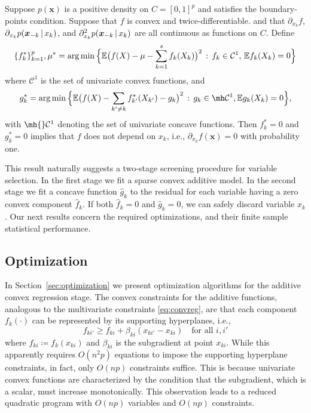 \begin{theorem}
Suppose $p(\mathbf{x})$ is a positive
density on $C=[0,1]^p$ and satisfies the boundary-points
condition. Suppose that $f$ is convex and twice-differentiable.
and that $\partial_{x_k} f$, $\partial_{x_k} p( \mbox{\boldmath $x$}_{-k}
{\,|\,} x_k )$, and $\partial_{x_k}^2 p( \mbox{\boldmath $x$}_{-k} {\,|\,} x_k)$
are all continuous as functions on $C$.
Define
\begin{equation}
\{ f^*_k \}_{k=1}^p,\mu^* = \arg\min \Big \{
{\mathbb E}\big( f(X) - \mu - \sum_{k=1}^s f_k(X_k) \big)^2 \,:\, f_k \in
\mathcal{C}^1, \, {\mathbb E} f_k(X_k) = 0 \Big \}
\end{equation} where $\mathcal{C}^1$ is the set of univariate convex
functions, and
\begin{equation}
g^*_k = \arg\min \Big\{ \E\big( f(X) -
\sum_{k' \neq k} f^*_{k'}(X_{k'}) - g_k \big)^2 \,:\, g_k \in \mh
\mathcal{C}^1, \E g_k(X_k) = 0 \Big\},
\end{equation}
with $\mh{}\mathcal{C}^1$ denoting the set of univariate concave
functions.  Then $f^*_k = 0$ and $g^*_k = 0$ implies that $f$ does not
depend on $x_k$, i.e., $\partial_{x_k} f(\mathbf{x}) = 0$ with
probability one.
\end{theorem}

This result naturally suggests a two-stage screening
procedure for variable selection. In the first stage we fit a sparse convex
additive model.  In the second stage we
fit a concave function $\hat g_k$ to the residual for each variable
having a zero convex component $\hat f_k$.  If both $\hat f_k = 0$ and
$\hat g_k = 0$, we can safely discard variable $x_k$.  
Our next results concern the required optimizations, and their finite
sample statistical performance.


\subsection{Optimization}

In Section~\ref{sec:optimization} we present optimization algorithms for the additive convex regression stage.
The convex constraints for the additive functions, analogous to 
the multivariate constraints \eqref{eq:convreg},
are  that each component $f_{k}(\cdot)$ 
can be represented by its supporting hyperplanes, i.e.,
\begin{equation}
      f_{ki'} \geq f_{ki} + \beta_{ki}(x_{ki'}-x_{ki}) \quad \text{for
        all $i,i'$}
\end{equation}
where $f_{ki}\coloneqq f_{k}(x_{ki})$ and $\beta_{ki}$ is the
subgradient at point $x_{ki}$. While this apparently requires $O(n^2
p)$ equations to impose the supporting hyperplane constraints, 
in fact, only $O(np)$ constraints suffice.  This is because univariate convex functions are
characterized by the condition that the subgradient, which is a scalar, must
increase monotonically. This observation leads to a reduced quadratic
program with $O(np)$ variables and $O(np)$ constraints. 

